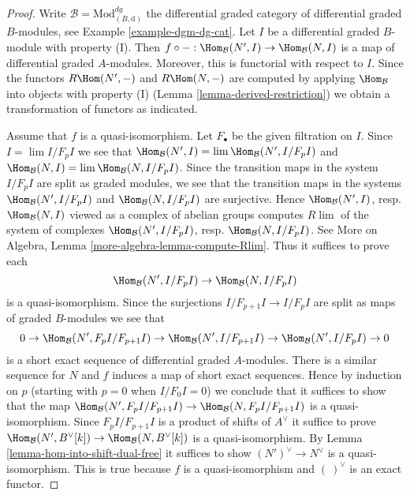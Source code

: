 \begin{proof}
Write $\mathcal{B} = \text{Mod}^{dg}_{(B, \text{d})}$ the
differential graded category of differential graded $B$-modules, see
Example \ref{example-dgm-dg-cat}.
Let $I$ be a differential graded $B$-module with property (I).
Then $f \circ - : \Hom_\mathcal{B}(N', I) \to \Hom_\mathcal{B}(N, I)$
is a map of differential graded $A$-modules. Moreover, this is functorial
with respect to $I$. Since the functors
$ R\Hom(N', -)$ and $R\Hom(N, -)$ are
computed by applying $\Hom_\mathcal{B}$ into objects with property (I)
(Lemma \ref{lemma-derived-restriction}) we obtain a transformation of functors
as indicated.

\medskip\noindent
Assume that $f$ is a quasi-isomorphism. Let $F_\bullet$ be the
given filtration on $I$. Since $I = \lim I/F_pI$ we see that
$\Hom_\mathcal{B}(N', I) = \lim \Hom_\mathcal{B}(N', I/F_pI)$ and
$\Hom_\mathcal{B}(N, I) = \lim \Hom_\mathcal{B}(N, I/F_pI)$.
Since the transition maps in the system $I/F_pI$ are split
as graded modules, we see that the transition maps in the
systems $\Hom_\mathcal{B}(N', I/F_pI)$ and $\Hom_\mathcal{B}(N, I/F_pI)$
are surjective. Hence $\Hom_\mathcal{B}(N', I)$, resp. $\Hom_\mathcal{B}(N, I)$
viewed as a complex of abelian groups computes $R\lim$ of the system
of complexes
$\Hom_\mathcal{B}(N', I/F_pI)$, resp. $\Hom_\mathcal{B}(N, I/F_pI)$.
See More on Algebra, Lemma \ref{more-algebra-lemma-compute-Rlim}.
Thus it suffices to prove each
$$
\Hom_\mathcal{B}(N', I/F_pI) \to \Hom_\mathcal{B}(N, I/F_pI)
$$
is a quasi-isomorphism. Since the surjections $I/F_{p + 1}I \to I/F_pI$
are split as maps of graded $B$-modules we see that
$$
0 \to \Hom_\mathcal{B}(N', F_pI/F_{p + 1}I) \to
\Hom_\mathcal{B}(N', I/F_{p + 1}I) \to
\Hom_\mathcal{B}(N', I/F_pI) \to 0
$$
is a short exact sequence of differential graded $A$-modules.
There is a similar sequence for $N$ and $f$ induces a map
of short exact sequences. Hence by induction on $p$ (starting with $p = 0$
when $I/F_0I = 0$) we conclude that it suffices to show that
the map
$\Hom_\mathcal{B}(N', F_pI/F_{p + 1}I) \to \Hom_\mathcal{B}(N, F_pI/F_{p + 1}I)$
is a quasi-isomorphism. Since $F_pI/F_{p + 1}I$ is a product of shifts of
$A^\vee$ it suffice to prove
$\Hom_\mathcal{B}(N', B^\vee[k]) \to \Hom_\mathcal{B}(N, B^\vee[k])$
is a quasi-isomorphism. By Lemma \ref{lemma-hom-into-shift-dual-free}
it suffices to show $(N')^\vee \to N^\vee$ is a quasi-isomorphism.
This is true because $f$ is a quasi-isomorphism and $(\ )^\vee$
is an exact functor.
\end{proof}


